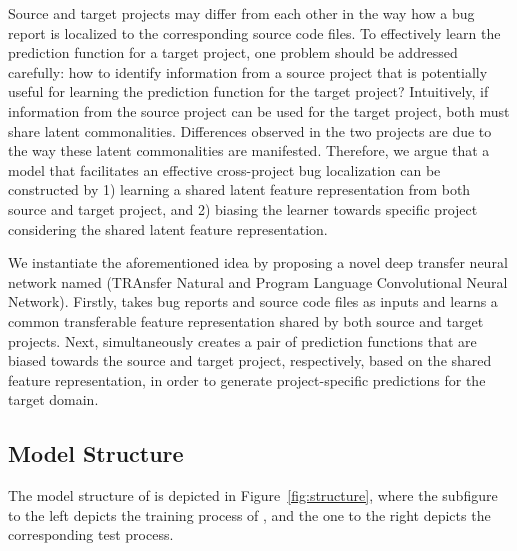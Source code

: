 Source and target projects may differ from each other in the way how a bug report is localized to the corresponding source code files. To effectively learn the prediction function for a target project, one problem should be addressed carefully: how to identify information from a source project that is potentially useful for learning the prediction function for the target project? Intuitively, if information from the source project can be used for the target project, both must share latent commonalities. Differences observed in the two projects are due to the way these latent commonalities are manifested. Therefore, we argue that a model that facilitates an effective cross-project bug localization can be constructed by 1) learning a shared latent feature representation from both source and target project, and 2) biasing the learner towards specific project considering the shared latent feature representation.

We instantiate the aforementioned idea by proposing a novel deep transfer neural network named \TRANPCNN (TRAnsfer Natural and Program Language Convolutional Neural Network). Firstly, \TRANPCNN takes bug reports and source code files as inputs and learns a common transferable feature representation shared by both source and target projects. Next, \TRANPCNN simultaneously creates a pair of prediction functions that are biased towards the source and target project, respectively, based on the shared feature representation, in order to generate project-specific predictions for the target domain. 

\subsection{Model Structure}

The model structure of \TRANPCNN is depicted in Figure~\ref{fig:structure}, where the subfigure to the left depicts the training process of \TRANPCNN, and the one to the right depicts the corresponding test process.


